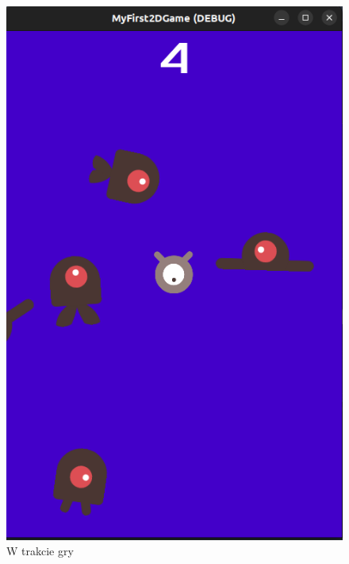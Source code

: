 \documentclass[a4paper]{article}
\begin{document}
\begin{center}
\begin{figure}
		\includegraphics[height=0.35\textheight]{game1.png}
		\caption{W trakcie gry}
	\end{figure}
	\begin{figure}
		\centering

\end{figure}
\end{center}
\end{document}
